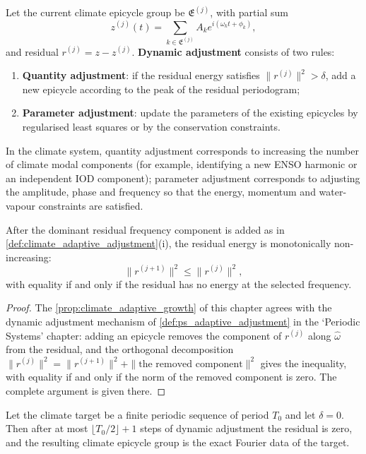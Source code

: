 \begin{definition}\label{def:climate_adaptive_adjustment}
Let the current climate epicycle group be $\mathfrak E^{(j)}$, with partial sum
\[
z^{(j)}(t)=\sum_{k\in\mathfrak E^{(j)}}A_k e^{i(\omega_k t+\phi_k)},
\]
and residual $r^{(j)}=z-z^{(j)}$. \textbf{Dynamic adjustment} consists of two rules:
\begin{enumerate}[label=(\roman*)]
    \item \textbf{Quantity adjustment}: if the residual energy satisfies $\|r^{(j)}\|^2>\delta$, add a new epicycle according to the peak of the residual periodogram;
    \item \textbf{Parameter adjustment}: update the parameters of the existing epicycles by regularised least squares or by the conservation constraints.
\end{enumerate}
In the climate system, quantity adjustment corresponds to increasing the number of climate modal components (for example, identifying a new ENSO harmonic or an independent IOD component); parameter adjustment corresponds to adjusting the amplitude, phase and frequency so that the energy, momentum and water-vapour constraints are satisfied.
\end{definition}

\begin{proposition}\label{prop:climate_adaptive_growth}
After the dominant residual frequency component is added as in \cref{def:climate_adaptive_adjustment}(i), the residual energy is monotonically non-increasing:
\[
\|r^{(j+1)}\|^2\le\|r^{(j)}\|^2,
\]
with equality if and only if the residual has no energy at the selected frequency.
\end{proposition}

\begin{proof}
The \cref{prop:climate_adaptive_growth} of this chapter agrees with the dynamic adjustment mechanism of \cref{def:ps_adaptive_adjustment} in the `Periodic Systems' chapter:
adding an epicycle removes the component of $r^{(j)}$ along $\hat\omega$ from the residual, and the orthogonal decomposition
$\|r^{(j)}\|^2=\|r^{(j+1)}\|^2+\|\text{the removed component}\|^2$ gives the inequality,
with equality if and only if the norm of the removed component is zero. The complete argument is given there.
\end{proof}

\begin{theorem}\label{thm:climate_adaptive_convergence}
Let the climate target be a finite periodic sequence of period $T_0$ and let $\delta=0$. Then after at most $\lfloor T_0/2\rfloor+1$ steps of dynamic adjustment the residual is zero, and the resulting climate epicycle group is the exact Fourier data of the target.
\end{theorem}

